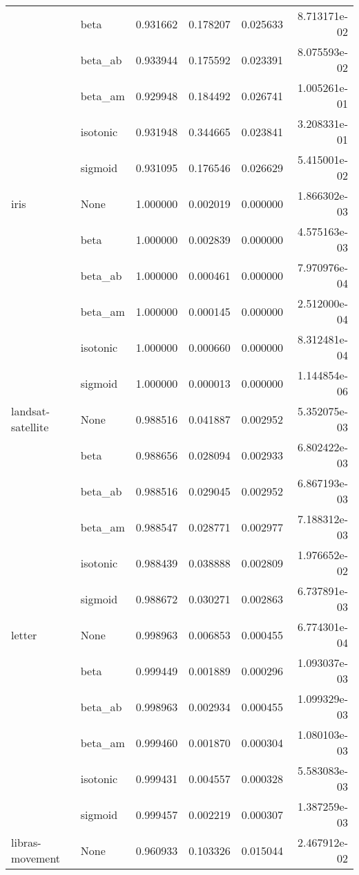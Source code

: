 \begin{tabular}{llrrrr}
        & beta &  0.931662 &  0.178207 &  0.025633 &  8.713171e-02 \\
        & beta\_ab &  0.933944 &  0.175592 &  0.023391 &  8.075593e-02 \\
        & beta\_am &  0.929948 &  0.184492 &  0.026741 &  1.005261e-01 \\
        & isotonic &  0.931948 &  0.344665 &  0.023841 &  3.208331e-01 \\
        & sigmoid &  0.931095 &  0.176546 &  0.026629 &  5.415001e-02 \\
iris & None &  1.000000 &  0.002019 &  0.000000 &  1.866302e-03 \\
        & beta &  1.000000 &  0.002839 &  0.000000 &  4.575163e-03 \\
        & beta\_ab &  1.000000 &  0.000461 &  0.000000 &  7.970976e-04 \\
        & beta\_am &  1.000000 &  0.000145 &  0.000000 &  2.512000e-04 \\
        & isotonic &  1.000000 &  0.000660 &  0.000000 &  8.312481e-04 \\
        & sigmoid &  1.000000 &  0.000013 &  0.000000 &  1.144854e-06 \\
landsat-satellite & None &  0.988516 &  0.041887 &  0.002952 &  5.352075e-03 \\
        & beta &  0.988656 &  0.028094 &  0.002933 &  6.802422e-03 \\
        & beta\_ab &  0.988516 &  0.029045 &  0.002952 &  6.867193e-03 \\
        & beta\_am &  0.988547 &  0.028771 &  0.002977 &  7.188312e-03 \\
        & isotonic &  0.988439 &  0.038888 &  0.002809 &  1.976652e-02 \\
        & sigmoid &  0.988672 &  0.030271 &  0.002863 &  6.737891e-03 \\
letter & None &  0.998963 &  0.006853 &  0.000455 &  6.774301e-04 \\
        & beta &  0.999449 &  0.001889 &  0.000296 &  1.093037e-03 \\
        & beta\_ab &  0.998963 &  0.002934 &  0.000455 &  1.099329e-03 \\
        & beta\_am &  0.999460 &  0.001870 &  0.000304 &  1.080103e-03 \\
        & isotonic &  0.999431 &  0.004557 &  0.000328 &  5.583083e-03 \\
        & sigmoid &  0.999457 &  0.002219 &  0.000307 &  1.387259e-03 \\
libras-movement & None &  0.960933 &  0.103326 &  0.015044 &  2.467912e-02 \\

\end{tabular}
